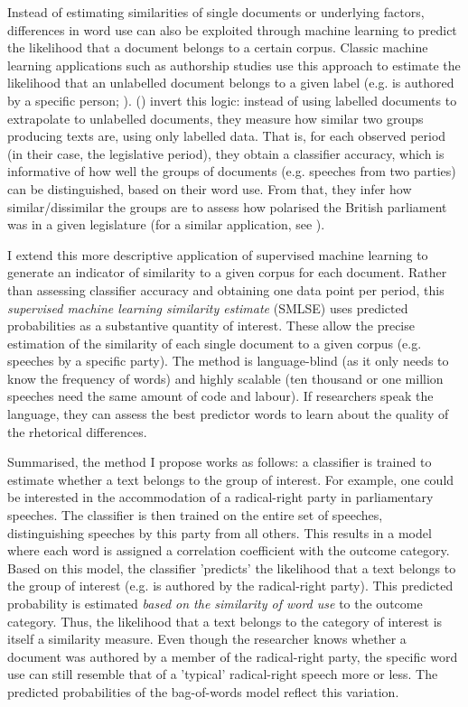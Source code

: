 \documentclass{article}
\begin{document}
Instead of estimating similarities of single documents or underlying factors, differences in word use can also be exploited through machine learning to predict the likelihood that a document belongs to a certain corpus. Classic machine learning applications such as authorship studies use this approach to estimate the likelihood that an unlabelled document belongs to a given label (e.g. is authored by a specific person; \cite{Mosteller1963}). \citeauthor{Peterson2018} (\citeyear{Peterson2018}) invert this logic: instead of using labelled documents to extrapolate to unlabelled documents, they measure how similar two groups producing texts are, using only labelled data. That is, for each observed period (in their case, the legislative period), they obtain a classifier accuracy, which is informative of how well the groups of documents (e.g. speeches from two parties) can be distinguished, based on their word use. From that, they infer how similar/dissimilar the groups are to assess how polarised the British parliament was in a given legislature (for a similar application, see \cite{Gentzkow2019}).\par 

I extend this more descriptive application of supervised machine learning to generate an indicator of similarity to a given corpus for each document. Rather than assessing classifier accuracy and obtaining one data point per period, this \textit{supervised machine learning similarity estimate} (SMLSE) uses predicted probabilities as a substantive quantity of interest. These allow the precise estimation of the similarity of each single document to a given corpus (e.g. speeches by a specific party). The method is language-blind (as it only needs to know the frequency of words) and highly scalable (ten thousand or one million speeches need the same amount of code and labour). If researchers speak the language, they can assess the best predictor words to learn about the quality of the rhetorical differences. \par

Summarised, the method I propose works as follows: a classifier is trained to estimate whether a text belongs to the group of interest. For example, one could be interested in the accommodation of a radical-right party in parliamentary speeches. The classifier is then trained on the entire set of speeches, distinguishing speeches by this party from all others. This results in a model where each word is assigned a correlation coefficient with the outcome category. Based on this model, the classifier 'predicts' the likelihood that a text belongs to the group of interest (e.g. is authored by the radical-right party). This predicted probability is estimated \textit{based on the similarity of word use} to the outcome category. Thus, the likelihood that a text belongs to the category of interest is itself a similarity measure. Even though the researcher knows whether a document was authored by a member of the radical-right party, the specific word use can still resemble that of a 'typical' radical-right speech more or less. The predicted probabilities of the bag-of-words model reflect this variation. \par
\end{document}
